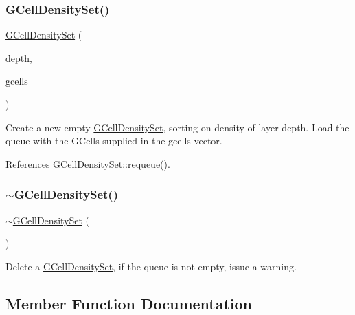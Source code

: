 \subsubsection{\texorpdfstring{G\+Cell\+Density\+Set()}{GCellDensitySet()}\hspace{0.1cm}{\footnotesize\ttfamily [2/2]}}
{\footnotesize\ttfamily \hyperlink{classKatabatic_1_1GCellDensitySet}{G\+Cell\+Density\+Set} (\begin{DoxyParamCaption}\item[{unsigned int}]{depth,  }\item[{const std\+::vector$<$ \hyperlink{classKatabatic_1_1GCell}{G\+Cell} $\ast$$>$ \&}]{gcells }\end{DoxyParamCaption})}

Create a new empty \hyperlink{classKatabatic_1_1GCellDensitySet}{G\+Cell\+Density\+Set}, sorting on density of layer {\ttfamily depth}. Load the queue with the G\+Cells supplied in the {\ttfamily gcells} vector. 

References G\+Cell\+Density\+Set\+::requeue().

\mbox{\label{classKatabatic_1_1GCellDensitySet_aef015ff8dc7d34fcb907281f71bb0003}} 
\subsubsection{\texorpdfstring{$\sim$\+G\+Cell\+Density\+Set()}{~GCellDensitySet()}}
{\footnotesize\ttfamily $\sim$\hyperlink{classKatabatic_1_1GCellDensitySet}{G\+Cell\+Density\+Set} (\begin{DoxyParamCaption}{ }\end{DoxyParamCaption})}

Delete a \hyperlink{classKatabatic_1_1GCellDensitySet}{G\+Cell\+Density\+Set}, if the queue is not empty, issue a warning. 

\subsection{Member Function Documentation}
\mbox{\label{classKatabatic_1_1GCellDensitySet_a644718bb2fb240de962dc3c9a1fdf0dc}} 
